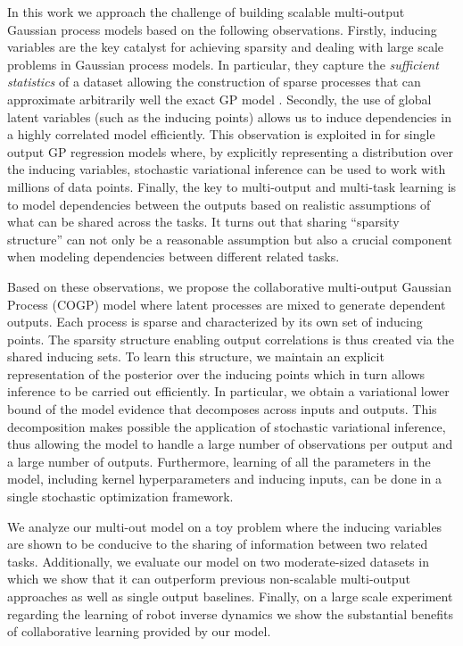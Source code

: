 In this work we approach the challenge of building scalable multi-output Gaussian process models  
based on the following observations.
Firstly, inducing variables are the key catalyst
for achieving sparsity and dealing with large scale problems in Gaussian process models.
In particular, they capture the \emph{sufficient statistics} of a dataset allowing the construction of sparse 
processes that can approximate arbitrarily well the exact GP model \citep{titsias2009variational}.
Secondly, the use of global latent variables (such as the inducing points) allows us to 
induce dependencies in a highly correlated model efficiently. 
This observation is exploited in \cite{hensmangaussian} for single output GP regression models 
where, by explicitly representing a distribution over the inducing variables, stochastic variational inference 
can be used to work with millions of data points.
Finally, the key to multi-output and multi-task learning is to model dependencies between the outputs  
based on realistic assumptions of what can be shared across the tasks. It turns out that 
sharing  ``sparsity structure'' can not only be a reasonable assumption but also a crucial component
when modeling dependencies between different related tasks.


Based on these observations, we propose the collaborative multi-output Gaussian Process (COGP) model 
where latent processes are mixed to generate dependent outputs. 
Each process is sparse and characterized by its own set of inducing points.
The sparsity structure enabling output correlations is thus created via the shared inducing sets. 
To learn this structure, we maintain an explicit representation of the posterior over the inducing points which in turn allows inference to be carried out efficiently.
In particular, we obtain a variational lower bound of the model evidence that decomposes across 
inputs and outputs. 
This decomposition makes possible the application of stochastic variational inference, 
thus allowing the model to handle a large number of observations per output and a large number of outputs.
Furthermore, learning of all  the  parameters in the model, including
kernel hyperparameters and inducing inputs, can be done in a single stochastic optimization framework.

We analyze our multi-out model on a toy problem  where the inducing variables are shown to be 
conducive to the sharing of information between two related tasks. 
Additionally, we  evaluate  our model on two moderate-sized datasets in which we show that it
can outperform previous non-scalable multi-output approaches as well as single output baselines.
Finally, on a  large scale experiment regarding the learning of robot inverse dynamics we show 
the substantial benefits of collaborative learning provided by our model.
  
